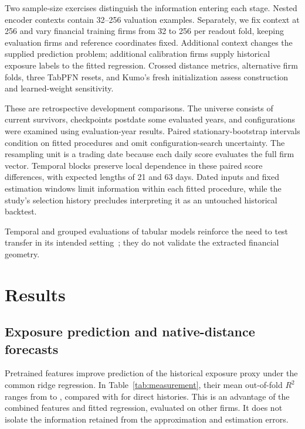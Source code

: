 \documentclass[11pt]{article}
\begin{document}
Two sample-size exercises distinguish the information entering each stage.
Nested encoder contexts contain 32--256 valuation examples. Separately, we fix
context at 256 and vary financial training firms from 32 to 256 per
readout fold,
keeping evaluation firms and reference coordinates fixed. Additional context
changes the supplied prediction problem; additional calibration firms supply
historical exposure labels to the fitted regression. Crossed distance metrics,
alternative firm folds, three TabPFN resets, and Kumo's fresh initialization
assess construction and learned-weight sensitivity.

These are retrospective development comparisons. The universe consists of
current survivors, checkpoints postdate some evaluated years, and configurations
were examined using evaluation-year results. Paired stationary-bootstrap
intervals condition on fitted procedures and omit configuration-search
uncertainty. The resampling unit is a trading date because each daily score
evaluates the full firm vector. Temporal blocks preserve local dependence in
these paired score differences, with expected lengths of 21 and 63 days.
Dated inputs and fixed estimation windows limit information within
each fitted procedure, while the study's selection history precludes
interpreting
it as an untouched historical backtest.

Temporal and grouped evaluations of tabular models reinforce the need to test
transfer in its intended setting~\cite{purucker}; they do not validate the
extracted financial geometry.

\section{Results}
\subsection{Exposure prediction and native-distance forecasts}
Pretrained features improve prediction of the historical exposure proxy under
the common ridge regression. In Table~\ref{tab:measurement}, their mean
out-of-fold $R^2$ ranges from \LimixDecoder{} to \DecoderBest{}, compared with
\DirectDecoder{} for direct histories. This is an advantage of the combined
features and fitted regression, evaluated on other firms. It does not isolate
the information retained from the approximation and estimation errors.
\end{document}
